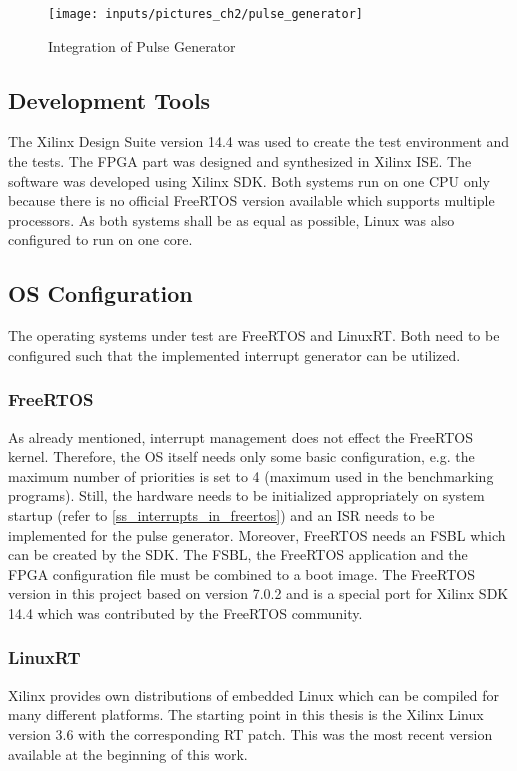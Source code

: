 \begin{figure}[htb]
		\begin{center}
			\texttt{[image: inputs/pictures\_ch2/pulse\_generator]}
			\caption{Integration of Pulse Generator} \label{fig_pulse_generator}
		\end{center}
\end{figure} 

\subsection{Development Tools}
The Xilinx Design Suite version 14.4 was used to create the test environment and the tests.
The \ac{FPGA} part was designed and synthesized in Xilinx \ac{ISE}.
The software was developed using Xilinx \ac{SDK}.
Both systems run on one \ac{CPU} only because there is no official FreeRTOS version available which supports multiple processors.
As both systems shall be as equal as possible, Linux was also configured to run on one core.

\subsection{\ac{OS} Configuration}
The operating systems under test are FreeRTOS and LinuxRT.
Both need to be configured such that the implemented interrupt generator can be utilized.

\subsubsection{FreeRTOS}
As already mentioned, interrupt management does not effect the FreeRTOS kernel.
Therefore, the \ac{OS} itself needs only some basic configuration, e.g. the maximum number of priorities is set to 4 (maximum used in the benchmarking programs).
Still, the hardware needs to be initialized appropriately on system startup (refer to \ref{ss_interrupts_in_freertos}) and an \ac{ISR} needs to be implemented for the pulse generator. 
Moreover, FreeRTOS needs an \ac{FSBL} which can be created by the \ac{SDK}.
The \ac{FSBL}, the FreeRTOS application and the \ac{FPGA} configuration file must be combined to a boot image.
The FreeRTOS version in this project based on version 7.0.2 and is a special port for Xilinx \ac{SDK} 14.4 which was contributed by the FreeRTOS community.

\subsubsection{LinuxRT}\label{sss_linuxrt}
Xilinx provides own distributions of embedded Linux which can be compiled for many different platforms. 
The starting point in this thesis is the Xilinx Linux version 3.6 with the corresponding RT patch.
This was the most recent version available at the beginning of this work.

